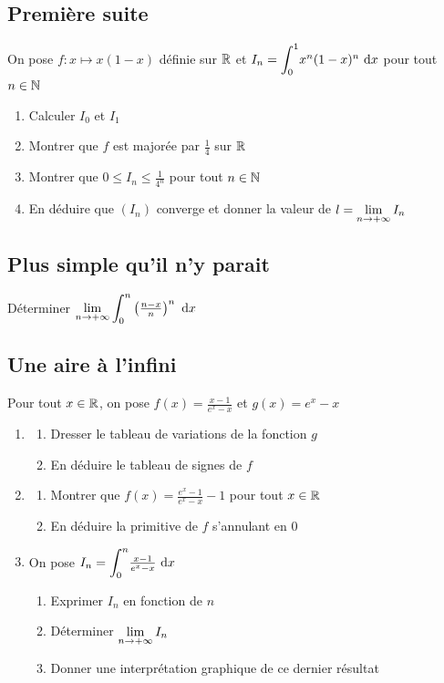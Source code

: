 \documentclass[oneside,12pt]{book}          %
\begin{document}
\subsection{Première suite}
On pose $f:x\mapsto x(1-x)$ définie sur ${\mathbb R}$ et $I_n={\displaystyle\int_{0}^{1}}x^n(1-x)^n{\,\,\mathrm{d}} x$ pour tout ${n\in\mathbb N}$
\begin{enumerate}
    \item Calculer $I_0$ et $I_1$
    \item Montrer que $f$ est majorée par $\frac{1}{4}$ sur ${\mathbb R}$
    \item Montrer que $0\leq I_n\leq\frac{1}{4^n}$ pour tout ${n\in\mathbb N}$
    \item En déduire que $(I_n)$ converge et donner la valeur de $l={\lim\limits_{n\to +\infty}}\, I_n$
\end{enumerate}



\subsection{Plus simple qu'il n'y parait}
Déterminer ${\lim\limits_{n\to +\infty}}\, {\displaystyle\int_{0}^{n}}\left(\frac{n-x}{n}\right)^n{\,\,\mathrm{d}} x$



\subsection{Une aire à l'infini}
Pour tout ${x\in\mathbb R}$, on pose $f(x)=\frac{x-1}{e^x-x}$ et $g(x)=e^x-x$
\begin{enumerate}
    \item \begin{enumerate}
        \item Dresser le tableau de variations de la fonction $g$
        \item En déduire le tableau de signes de $f$
    \end{enumerate}
    \item \begin{enumerate}
        \item Montrer que $f(x)=\frac{e^x-1}{e^x-x}-1$ pour tout ${x\in\mathbb R}$
        \item En déduire la primitive de $f$ s'annulant  en 0
    \end{enumerate}
    \item On pose $I_n={\displaystyle\int_{0}^{n}}\frac{x-1}{e^x-x}{\,\,\mathrm{d}} x$
    \begin{enumerate}
        \item Exprimer $I_n$ en fonction de $n$
        \item Déterminer ${\lim\limits_{n\to +\infty}}\, I_n$
        \item Donner une interprétation graphique de ce dernier résultat
    \end{enumerate}
\end{enumerate}
\end{document}
